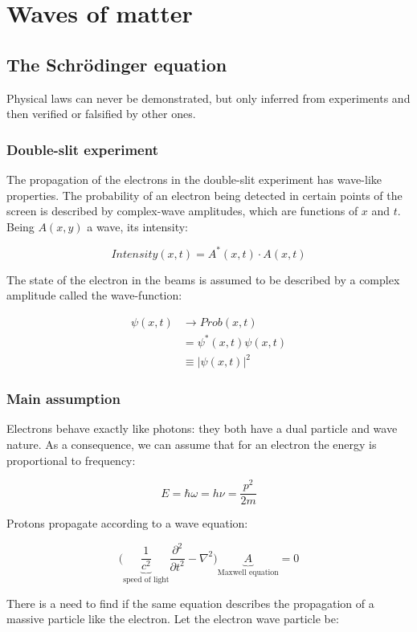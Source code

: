 \chapter{Waves of matter}

\section{The Schr\"odinger equation}
Physical laws can never be demonstrated, but only inferred from experiments and then verified or falsified by other ones.


  \subsection{Double-slit experiment}
  The propagation of the electrons in the double-slit experiment has wave-like properties.
  The probability of an electron being detected in certain points of the screen is described by complex-wave amplitudes, which are functions of $x$ and $t$. Being $A(x,y)$ a wave, its intensity:

  $$Intensity(x,t) = A^*(x,t)\cdot A(x,t)$$

  The state of the electron in the beams is assumed to be described by a complex amplitude called the wave-function:

  \begin{align*}
    \psi(x,t) &\rightarrow Prob(x,t)\\
              &=\psi^*(x,t)\psi(x,t)\\
              &\equiv |\psi(x,t)|^2
  \end{align*}

  \subsection{Main assumption}
  Electrons behave exactly like photons: they both have a dual particle and wave nature.
  As a consequence, we can assume that for an electron the energy is proportional to frequency:

  $$E = \hbar\omega = h\nu = \frac{p^2}{2m}$$

  Protons propagate according to a wave equation:

  $$\biggl(\underbrace{\frac{1}{c^2}}_{\text{speed of light}}\frac{\partial^2{}}{\partial{t^2}} - \nabla^2\biggr)\underbrace{A}_{\text{Maxwell equation}} = 0$$

  There is a need to find if the same equation describes the propagation of a massive particle like the electron.
  Let the electron wave particle be:

